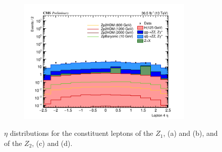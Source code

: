 \begin{enumerate}
\begin{figure}[tbh]
\begin{subfigure}{0.50\textwidth}
\caption{}
\end{subfigure}
\begin{subfigure}{0.50\textwidth}
\centering
\includegraphics[width=3.3in]{figures/hist_hEtaLep4_5.png}
\caption{}
\end{subfigure}
\caption{$\eta$ distributions for the constituent leptons of the $Z_1$, (a) and (b), and of the $Z_2$, (c) and (d).}
\label{fig:lep5kin2}
\end{figure}



\end{enumerate}
